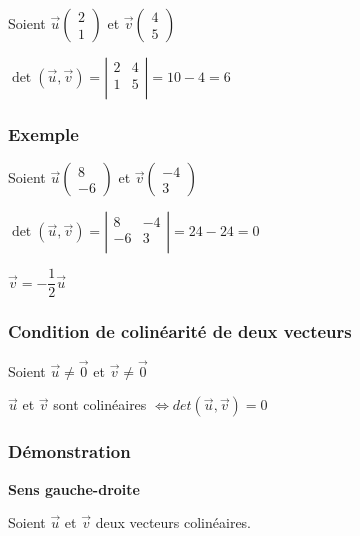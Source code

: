 Soient $\vec{u}\left(\begin{array}{c} 2\\ 1 \end{array}\right)$ et $\vec{v}\left(\begin{array}{c} 4\\ 5 \end{array}\right)$

$\det\left(\vec{u}, \vec{v}\right) = \left| \begin{array}{cc}  2 & 4 \\ 1 & 5  \\ \end{array} \right| = 10 - 4 = 6 $

\subsubsection{Exemple }

Soient $\vec{u}\left(\begin{array}{c} 8\\ -6 \end{array}\right)$ et $\vec{v}\left(\begin{array}{c} -4\\ 3 \end{array}\right)$

$\det\left(\vec{u}, \vec{v}\right) = \left| \begin{array}{cc}  8 & -4 \\ -6 & 3  \\ \end{array} \right| = 24 - 24 = 0 $

$\vec{v} = -\dfrac{1}{2} \vec{u} $

\subsubsection{Condition de colinéarité de deux vecteurs}

Soient $\vec{u} \neq \overrightarrow{0} $ et $ \vec{v} \neq \overrightarrow{0} $

$\vec{u}$ et $ \vec{v}$ sont colinéaires $\Longleftrightarrow det\left(\vec{u}, \vec{v}\right) = 0 $
\newpage 
\subsubsection{Démonstration}

\textbf{Sens gauche-droite}

Soient $\vec{u}$ et $ \vec{v}$ deux vecteurs colinéaires.

